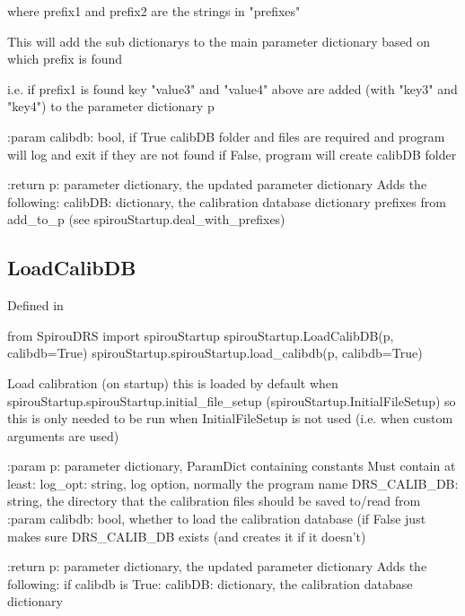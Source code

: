 \begin{minipage}{\textwidth}
\begin{pythondocstring}
        where prefix1 and prefix2 are the strings in "prefixes"

        This will add the sub dictionarys to the main parameter dictionary
        based on which prefix is found

        i.e. if prefix1 is found key "value3" and "value4" above are added
        (with "key3" and "key4") to the parameter dictionary p

:param calibdb: bool, if True calibDB folder and files are required and
                program will log and exit if they are not found
                if False, program will create calibDB folder

:return p: parameter dictionary, the updated parameter dictionary
        Adds the following:
            calibDB: dictionary, the calibration database dictionary
            prefixes from add_to_p (see spirouStartup.deal_with_prefixes)
\end{pythondocstring}
\end{minipage}


\noindent\begin{minipage}{\textwidth}
\subsection{LoadCalibDB}

Defined in \spirouStartup{}

\begin{pythonbox}
from SpirouDRS import spirouStartup
spirouStartup.LoadCalibDB(p, calibdb=True)
spirouStartup.spirouStartup.load_calibdb(p, calibdb=True)
\end{pythonbox}

\begin{pythondocstring}
Load calibration (on startup) this is loaded by default when
spirouStartup.spirouStartup.initial_file_setup
(spirouStartup.InitialFileSetup) so this is only needed to be run when
InitialFileSetup is not used (i.e. when custom arguments are used)


:param p: parameter dictionary, ParamDict containing constants
    Must contain at least:
            log_opt: string, log option, normally the program name
            DRS_CALIB_DB: string, the directory that the calibration
                          files should be saved to/read from
:param calibdb: bool, whether to load the calibration database (if False
                just makes sure DRS_CALIB_DB exists (and creates it if it
                doesn't)

:return p: parameter dictionary, the updated parameter dictionary
        Adds the following:
            if calibdb is True:
                calibDB: dictionary, the calibration database dictionary
\end{pythondocstring}
\end{minipage}



